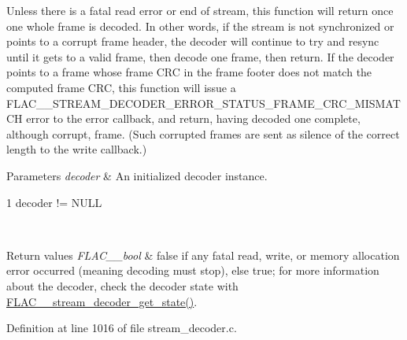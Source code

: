 Unless there is a fatal read error or end of stream, this function will return once one whole frame is decoded. In other words, if the stream is not synchronized or points to a corrupt frame header, the decoder will continue to try and resync until it gets to a valid frame, then decode one frame, then return. If the decoder points to a frame whose frame C\+RC in the frame footer does not match the computed frame C\+RC, this function will issue a F\+L\+A\+C\+\_\+\+\_\+\+S\+T\+R\+E\+A\+M\+\_\+\+D\+E\+C\+O\+D\+E\+R\+\_\+\+E\+R\+R\+O\+R\+\_\+\+S\+T\+A\+T\+U\+S\+\_\+\+F\+R\+A\+M\+E\+\_\+\+C\+R\+C\+\_\+\+M\+I\+S\+M\+A\+T\+CH error to the error callback, and return, having decoded one complete, although corrupt, frame. (Such corrupted frames are sent as silence of the correct length to the write callback.)


\begin{DoxyParams}{Parameters}
{\em decoder} & An initialized decoder instance.  
\begin{DoxyCode}
1 decoder != NULL 
\end{DoxyCode}
 \\
\hline
\end{DoxyParams}

\begin{DoxyRetVals}{Return values}
{\em F\+L\+A\+C\+\_\+\+\_\+bool} & {\ttfamily false} if any fatal read, write, or memory allocation error occurred (meaning decoding must stop), else {\ttfamily true}; for more information about the decoder, check the decoder state with \hyperlink{group__flac__stream__decoder_ga5899c204ad7183ec04e41855090c0635}{F\+L\+A\+C\+\_\+\+\_\+stream\+\_\+decoder\+\_\+get\+\_\+state()}. \\
\hline
\end{DoxyRetVals}


Definition at line 1016 of file stream\+\_\+decoder.\+c.

